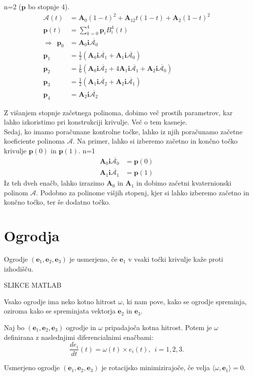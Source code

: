 \documentclass[mat1]{fmfdelo}
\newcommand{\ii}{\boldsymbol i}
\newcommand{\pp}{\boldsymbol p}
\newcommand{\ba}{\boldsymbol A}
\newcommand{\e}{\boldsymbol e}
\newcommand{\A}{\mathcal A}
\begin{document}
\begin{primer}
n=2 ($\pp$ bo stopnje 4).
\begin{equation*}
\begin{split}
\A(t) &= \ba_0(1-t)^2 + \ba_12t(1-t) + \ba_2(1-t)^2\\
\pp(t)& = \sum_{k=0}^4\pp_iB_i^4(t) \\
\Longrightarrow ~~\pp_0 & = \ba_0\ii\overline{\A_0} \\
\pp_1 &= \frac{1}{2}\left( \ba_0\ii\overline{\A_1} + \ba_1\ii\overline{\A_0} \right) \\
\pp_2 &= \frac{1}{6} \left( \ba_0\ii\overline{\A_2} + 4\ba_1\ii\overline{\A_1}+\ba_2\ii\overline{\A_0} \right) \\
\pp_3 &= \frac{1}{2} \left( \ba_1\ii\overline{\A_2}+\ba_2\ii\overline{\A_1} \right) \\
\pp_4 &= \ba_2\ii\overline{\A_2}
\end{split}
\end{equation*}
\end{primer}
Z višanjem stopnje začetnega polinoma, dobimo več prostih parametrov, kar lahko izkoristimo pri konstrukciji krivulje. Več o tem kasneje.\\
Sedaj, ko imamo poračunane kontrolne točke, lahko iz njih poračunamo začetne koeficiente polinoma $\A$. Na primer, lahko si izberemo začetno in končno točko krivulje $\pp(0)$ in $\pp(1)$. n=1
\begin{equation*}
\begin{split}
\ba_0\ii\overline{\A_0} &= \pp(0) \\
\ba_1\ii\overline{\A_1} &= \pp(1)
\end{split}
\end{equation*}
Iz teh dveh enačb, lahko izrazimo $\ba_0$ in $\ba_1$ in dobimo začetni kvaternionski polinom $\A$. Podobno za polinome višjih stopenj, kjer si lahko izberemo začetno in končno točko, ter še dodatno točko.

\section{Ogrodja}
\begin{definicija}
Ogrodje $(\e_1,\e_2,\e_3)$ je usmerjeno, če $\e_1$ v vsaki točki krivulje kaže proti izhodišču.
\end{definicija}
SLIKCE MATLAB

Vsako ogrodje ima neko kotno hitrost $\omega$, ki nam pove, kako se ogrodje spreminja, oziroma kako se spreminjata vektorja $\e_2$ in $\e_3$.
\begin{definicija}
Naj bo $(\e_1,\e_2,\e_3)$ ogrodje in $\omega$ pripadajoča kotna hitrost. Potem je $\omega$ definirana z naslednjimi diferencialnimi enačbami:
\begin{equation}
\frac{de_i}{dt}(t) = \omega(t) \times e_i(t), ~~ i=1,2,3.
\end{equation}
\end{definicija}
\begin{definicija}
Usmerjeno ogrodje $(\e_1,\e_2,\e_3)$ je rotacijsko minimizirajoče, če velja $\langle \omega,\e_1\rangle = 0.$
\end{definicija}
\end{document}

